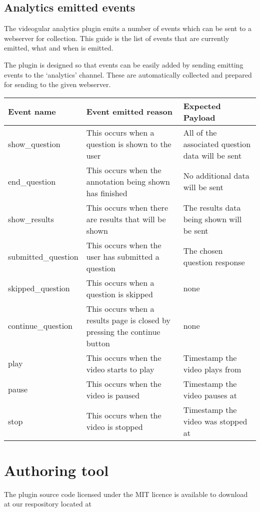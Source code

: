 \documentclass[12pt,a4paper]{article}
\begin{document}
\subsection{Analytics emitted events}

The videogular analytics plugin emits a number of events which can be sent to a webserver for collection. This guide is the list of events that are currently emitted, what and when is emitted.

The plugin is designed so that events can be easily added by sending emitting events to the `analytics' channel. These are automatically collected and prepared for sending to the given webserver.

\begin{tabular}{p{3.2cm} p{7cm} p{4cm}}

\textbf{Event name} & \textbf{Event emitted reason} & \textbf{Expected Payload} \\ 
\hline 
show\_question & This occurs when a question is shown to the user & All of the associated question data will be sent \\ 
\hline 
end\_question & This occurs when the annotation being shown has finished & No additional data will be sent \\ 
\hline 
show\_results & This occurs when there are results that will be shown & The results data being shown will be sent \\ 
\hline 
submitted\_question & This occurs when the user has submitted a question & The chosen question response \\ 
\hline 
skipped\_question & This occurs when a question is skipped & none \\ 
\hline 
continue\_question & This occurs when a results page is closed by pressing the continue button & none \\ 
\hline 
play & This occurs when the video starts to play & Timestamp the video plays from \\ 
\hline 
pause & This occurs when the video is paused & Timestamp the video pauses at \\ 
\hline 
stop & This occurs when the video is stopped & Timestamp the video was stopped at \\
\end{tabular} 


\section{Authoring tool}

The plugin source code licensed under the MIT licence is available to download at our respository located at 
\end{document}
